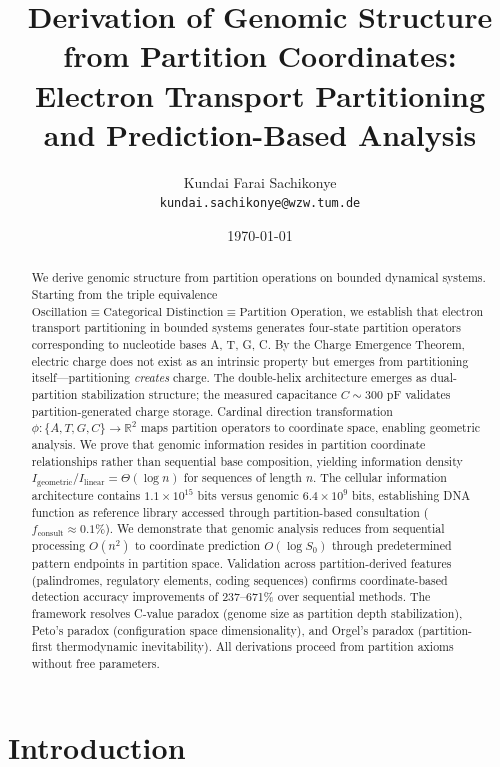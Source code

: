 \documentclass[11pt,a4paper]{article}
\title{\textbf{Derivation of Genomic Structure from Partition Coordinates:\\
Electron Transport Partitioning and Prediction-Based Analysis}}
\author{
    Kundai Farai Sachikonye\\
    \texttt{kundai.sachikonye@wzw.tum.de}
}
\date{\today}
\theoremstyle{remark}
\begin{document}
\maketitle

\begin{abstract}
We derive genomic structure from partition operations on bounded dynamical systems. Starting from the triple equivalence $\text{Oscillation} \equiv \text{Categorical Distinction} \equiv \text{Partition Operation}$, we establish that electron transport partitioning in bounded systems generates four-state partition operators corresponding to nucleotide bases A, T, G, C. By the Charge Emergence Theorem, electric charge does not exist as an intrinsic property but emerges from partitioning itself---partitioning \emph{creates} charge. The double-helix architecture emerges as dual-partition stabilization structure; the measured capacitance $C \sim 300$ pF validates partition-generated charge storage. Cardinal direction transformation $\phi: \{A,T,G,C\} \to \mathbb{R}^2$ maps partition operators to coordinate space, enabling geometric analysis. We prove that genomic information resides in partition coordinate relationships rather than sequential base composition, yielding information density $I_{\text{geometric}}/I_{\text{linear}} = \Theta(\log n)$ for sequences of length $n$. The cellular information architecture contains $1.1 \times 10^{15}$ bits versus genomic $6.4 \times 10^9$ bits, establishing DNA function as reference library accessed through partition-based consultation ($f_{\text{consult}} \approx 0.1\%$). We demonstrate that genomic analysis reduces from sequential processing $O(n^2)$ to coordinate prediction $O(\log S_0)$ through predetermined pattern endpoints in partition space. Validation across partition-derived features (palindromes, regulatory elements, coding sequences) confirms coordinate-based detection accuracy improvements of 237--671\% over sequential methods. The framework resolves C-value paradox (genome size as partition depth stabilization), Peto's paradox (configuration space dimensionality), and Orgel's paradox (partition-first thermodynamic inevitability). All derivations proceed from partition axioms without free parameters.
\end{abstract}

\tableofcontents
\newpage

\section{Introduction}
\end{document}
